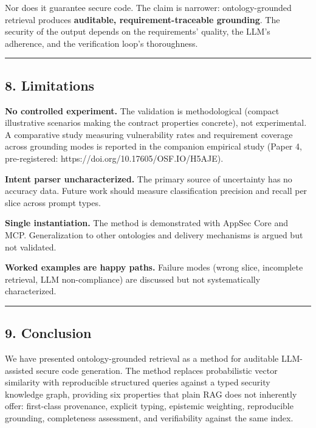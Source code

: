 \documentclass[
]{article}
\begin{document}
Nor does it guarantee secure code. The claim is narrower:
ontology-grounded retrieval produces \textbf{auditable,
requirement-traceable grounding}. The security of the output depends on
the requirements' quality, the LLM's adherence, and the verification
loop's thoroughness.

\begin{center}\rule{0.5\linewidth}{0.5pt}\end{center}

\subsection{8. Limitations}\label{limitations}

\textbf{No controlled experiment.} The validation is methodological
(compact illustrative scenarios making the contract properties
concrete), not experimental. A comparative study measuring vulnerability
rates and requirement coverage across grounding modes is reported in the
companion empirical study (Paper 4, pre-registered:
https://doi.org/10.17605/OSF.IO/H5AJE).

\textbf{Intent parser uncharacterized.} The primary source of
uncertainty has no accuracy data. Future work should measure
classification precision and recall per slice across prompt types.

\textbf{Single instantiation.} The method is demonstrated with AppSec
Core and MCP. Generalization to other ontologies and delivery mechanisms
is argued but not validated.

\textbf{Worked examples are happy paths.} Failure modes (wrong slice,
incomplete retrieval, LLM non-compliance) are discussed but not
systematically characterized.

\begin{center}\rule{0.5\linewidth}{0.5pt}\end{center}

\subsection{9. Conclusion}\label{conclusion}

We have presented ontology-grounded retrieval as a method for auditable
LLM-assisted secure code generation. The method replaces probabilistic
vector similarity with reproducible structured queries against a typed
security knowledge graph, providing six properties that plain RAG does
not inherently offer: first-class provenance, explicit typing, epistemic
weighting, reproducible grounding, completeness assessment, and
verifiability against the same index.
\end{document}
